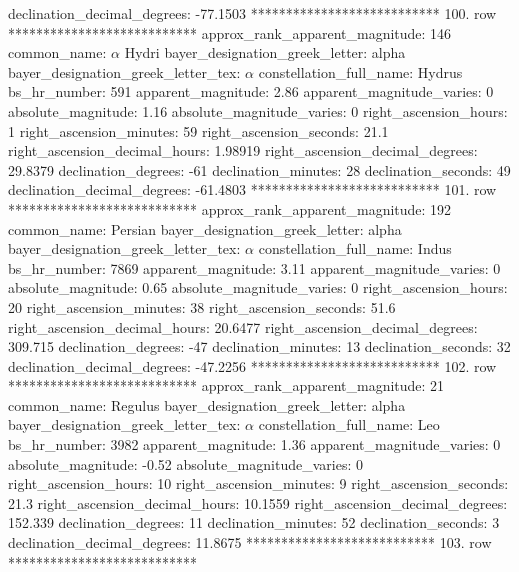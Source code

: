        declination_decimal_degrees: -77.1503
*************************** 100. row ***************************
    approx_rank_apparent_magnitude: 146
                       common_name: $\alpha$ Hydri
    bayer_designation_greek_letter: alpha
bayer_designation_greek_letter_tex: $\alpha$
           constellation_full_name: Hydrus
                      bs_hr_number: 591
                apparent_magnitude: 2.86
         apparent_magnitude_varies: 0
                absolute_magnitude: 1.16
         absolute_magnitude_varies: 0
             right_ascension_hours: 1
           right_ascension_minutes: 59
           right_ascension_seconds: 21.1
     right_ascension_decimal_hours: 1.98919
   right_ascension_decimal_degrees: 29.8379
               declination_degrees: -61
               declination_minutes: 28
               declination_seconds: 49
       declination_decimal_degrees: -61.4803
*************************** 101. row ***************************
    approx_rank_apparent_magnitude: 192
                       common_name: Persian
    bayer_designation_greek_letter: alpha
bayer_designation_greek_letter_tex: $\alpha$
           constellation_full_name: Indus
                      bs_hr_number: 7869
                apparent_magnitude: 3.11
         apparent_magnitude_varies: 0
                absolute_magnitude: 0.65
         absolute_magnitude_varies: 0
             right_ascension_hours: 20
           right_ascension_minutes: 38
           right_ascension_seconds: 51.6
     right_ascension_decimal_hours: 20.6477
   right_ascension_decimal_degrees: 309.715
               declination_degrees: -47
               declination_minutes: 13
               declination_seconds: 32
       declination_decimal_degrees: -47.2256
*************************** 102. row ***************************
    approx_rank_apparent_magnitude: 21
                       common_name: Regulus
    bayer_designation_greek_letter: alpha
bayer_designation_greek_letter_tex: $\alpha$
           constellation_full_name: Leo
                      bs_hr_number: 3982
                apparent_magnitude: 1.36
         apparent_magnitude_varies: 0
                absolute_magnitude: -0.52
         absolute_magnitude_varies: 0
             right_ascension_hours: 10
           right_ascension_minutes: 9
           right_ascension_seconds: 21.3
     right_ascension_decimal_hours: 10.1559
   right_ascension_decimal_degrees: 152.339
               declination_degrees: 11
               declination_minutes: 52
               declination_seconds: 3
       declination_decimal_degrees: 11.8675
*************************** 103. row ***************************
